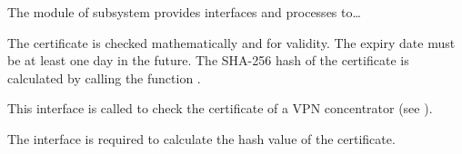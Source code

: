 


The module  of subsystem  provides interfaces
and processes to…



The certificate is checked mathematically and for validity. The expiry date must
be at least one day in the future. The SHA-256 hash of the certificate is
calculated by calling the function
.





This interface is called to check the certificate of a VPN concentrator (see
).


The interface  is required to
calculate the hash value of the certificate.

